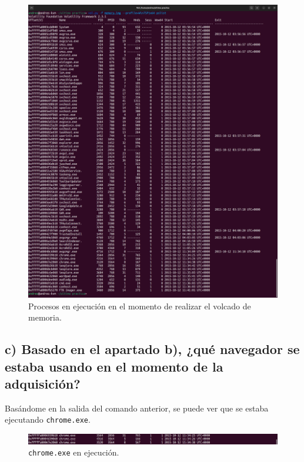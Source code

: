 \documentclass{article}
\begin{document}
\begin{figure}[H]
    \centering
    \includegraphics[width=\textwidth]{imagenes/pslist.png}
    \caption{Procesos en ejecución en el momento de realizar el volcado de memoria.}
\end{figure}

\newpage
\subsection{c) Basado en el apartado b), ¿qué navegador se estaba usando en el momento de la adquisición?}

Basándome en la salida del comando anterior, se puede ver que se estaba ejecutando \verb|chrome.exe|.

\begin{figure}[H]
    \centering
    \includegraphics[width=\textwidth]{imagenes/pslist-1.png}
    \caption{\texttt{chrome.exe} en ejecución.}
\end{figure}
\end{document}
